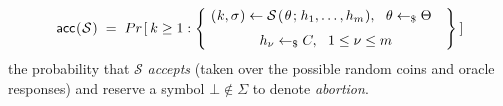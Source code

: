 \documentclass[psamsfonts, reqno]{amsart}
\theoremstyle{definition}
\theoremstyle{remark}
\numberwithin{equation}{section}
\begin{document}
\begin{equation}\label{local_forking_acc}
\mathsf{acc}
	\hspace{0.5pt}
	(
		\hspace{0.5pt}
		\mathcal{S}
		\hspace{0.5pt}
	)
\hspace{3pt}
=
\hspace{3pt}
Pr\hspace{1pt}[\hspace{2pt}k \ge 1 :
\begin{Bmatrix}
\ (
	\hspace{0.5pt}
	k,
	\sigma
	\hspace{0.5pt}
)
\leftarrow
\mathcal{S}
	\hspace{1pt}
	(
		\hspace{1pt}
		\theta
		\hspace{1pt}
		;
		\hspace{1pt}
		h_1,
		\dots,
		h_m
		\hspace{0.5pt}
	),
\ \ \theta \leftarrow_\$ \Theta\ \ \ \\[6pt]
h_\nu \leftarrow_\$ C,
\ \ 1 \le \nu \le m
\end{Bmatrix}
\hspace{2pt}]\\[6pt]
\end{equation}
the probability that $\mathcal{S}$ \textit{accepts}
(taken over the possible random coins and oracle responses)
and reserve a symbol $\bot \not \in \Sigma$
to denote \textit{abortion}.
\end{document}
